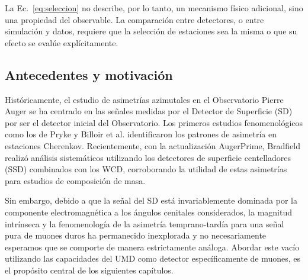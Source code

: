 La Ec.~\ref{eq:seleccion} no describe, por lo tanto, un mecanismo físico adicional, sino una propiedad del observable. La comparación entre detectores, o entre simulación y datos, requiere que la selección de estaciones sea la misma o que su efecto se evalúe explícitamente.

\subsection{Antecedentes y motivación}
\label{subsec:antecedentes}

Históricamente, el estudio de asimetrías azimutales en el Observatorio Pierre Auger se ha centrado en las señales medidas por el Detector de Superficie (SD) por ser el detector inicial del Observatorio. Los primeros estudios fenomenológicos como los de Pryke \cite{Pryke1998} y Billoir et al. \cite{Billoir2002} identificaron los patrones de asimetría en estaciones Cherenkov. Recientemente, con la actualización AugerPrime, Bradfield \cite{BradfieldThesis} realizó análisis sistemáticos utilizando los detectores de superficie centelladores (SSD) combinados con los WCD, corroborando la utilidad de estas asimetrías para estudios de composición de masa.

Sin embargo, debido a que la señal del SD está invariablemente dominada por la componente electromagnética a los ángulos cenitales considerados, la magnitud intrínseca y la fenomenología de la asimetría temprano-tardía para una señal pura de muones duros ha permanecido inexplorada y no necesariamente esperamos que se comporte de manera estrictamente análoga. Abordar este vacío utilizando las capacidades del UMD como detector específicamente de muones, es el propósito central de los siguientes capítulos.

\newpage
